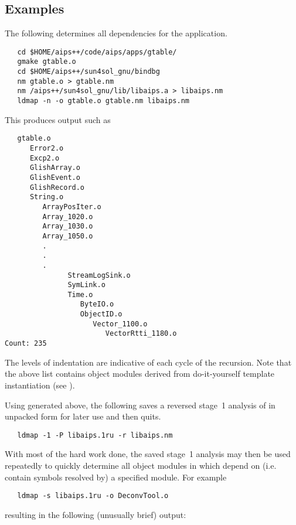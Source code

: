 \subsection*{Examples}

The following determines all dependencies for the  application.

\begin{verbatim}
   cd $HOME/aips++/code/aips/apps/gtable/
   gmake gtable.o
   cd $HOME/aips++/sun4sol_gnu/bindbg
   nm gtable.o > gtable.nm
   nm /aips++/sun4sol_gnu/lib/libaips.a > libaips.nm
   ldmap -n -o gtable.o gtable.nm libaips.nm
\end{verbatim}

\noindent
This produces output such as

\begin{verbatim}
   gtable.o
      Error2.o
      Excp2.o
      GlishArray.o
      GlishEvent.o
      GlishRecord.o
      String.o
         ArrayPosIter.o
         Array_1020.o
         Array_1030.o
         Array_1050.o
         .
         .
         .
               StreamLogSink.o
               SymLink.o
               Time.o
                  ByteIO.o
                  ObjectID.o
                     Vector_1100.o
                        VectorRtti_1180.o
Count: 235
\end{verbatim}

\noindent
The levels of indentation are indicative of each cycle of the recursion.  Note
that the above list contains object modules derived from do-it-yourself
template instantiation (see ).

Using  generated above, the following saves a reversed
stage~1 analysis of  in unpacked form for later use and then
quits.

\begin{verbatim}
   ldmap -1 -P libaips.1ru -r libaips.nm
\end{verbatim}

\noindent
With most of the hard work done, the saved stage~1 analysis may then be used
repeatedly to quickly determine all object modules in  which
depend on (i.e. contain symbols resolved by) a specified module.  For example

\begin{verbatim}
   ldmap -s libaips.1ru -o DeconvTool.o
\end{verbatim}

\noindent
resulting in the following (unusually brief) output:

